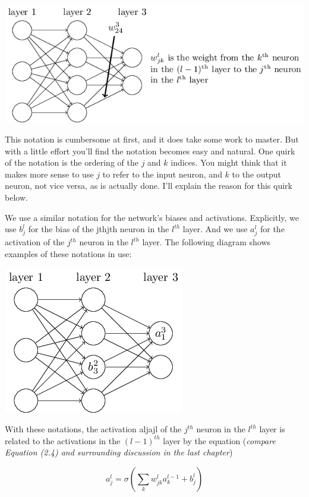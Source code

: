 \documentclass[a4paper,12pt]{report}%
\begin{document}
\begin{center}
 \includegraphics[width=0.95\linewidth]{images/tikz16.png}
\end{center}

This notation is cumbersome at first, and it does take some work to master. But with a little effort you'll find the notation becomes easy and natural. One quirk of the notation is the ordering of the $j$ and $k$ indices. You might think that it makes more sense to use $j$ to refer to the input neuron, and $k$ to the output neuron, not vice versa, as is actually done. I'll explain the reason for this quirk below.

We use a similar notation for the network's biases and activations. Explicitly, we use $b^{l}_{j}$ for the bias of the jthjth neuron in the $l^{th}$ layer. And we use $a^{l}_{j}$ for the activation of the $j^{th}$ neuron in the $l^{th}$ layer. The following diagram shows examples of these notations in use:

\begin{center}
 \includegraphics[width=0.4\linewidth]{images/tikz17.png}
\end{center}

With these notations, the activation aljajl of the $j^{th}$ neuron in the $l^{th}$ layer is related to the activations in the $(l−1)^{th}$ layer by the equation ({\it compare Equation (2.4) and surrounding discussion in the last chapter})

\begin{equation}
 a^{l}_{j} = \sigma \left( \sum_{k} w^{l}_{jk}  a^{l-1}_{k} + b^{l}_{j} \right)
\end{equation}
\end{document}
